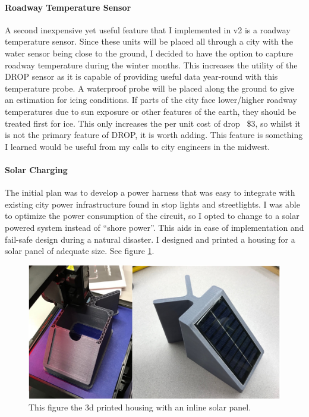 \documentclass[letter]{article}
\begin{document}
\paragraph{Roadway Temperature Sensor} A second inexpensive yet useful feature that I implemented in v2 is a roadway temperature sensor. Since these units will be placed all through a city with the water sensor being close to the ground, I decided to have the option to capture roadway temperature during the winter months. This increases the utility of the DROP sensor as it is capable of providing useful data year-round with this temperature probe. A waterproof probe will be placed along the ground to give an estimation for icing conditions. If parts of the city face lower/higher roadway temperatures due to sun exposure or other features of the earth, they should be treated first for ice. This only increases the per unit cost of drop ~\$3, so whilst it is not the primary feature of DROP, it is worth adding. This feature is something I learned would be useful from my calls to city engineers in the midwest. 

\paragraph{Solar Charging} The initial plan was to develop a power harness that was easy to integrate with existing city power infrastructure found in stop lights and streetlights. I was able to optimize the power consumption of the circuit, so I opted to change to a solar powered system instead of ``shore power''. This aids in ease of implementation and fail-safe design during a natural disaster. I designed and printed a housing for a solar panel of adequate size. See figure \ref{fig:3dPrintHousing}.

\begin{figure}[ht]
	\centering
	\includegraphics[width=.8\textwidth]{img/3dPrintHousing.PNG}
	\caption{\label{fig:3dPrintHousing} This figure the 3d printed housing with an inline solar panel.}
\end{figure}
\end{document}
